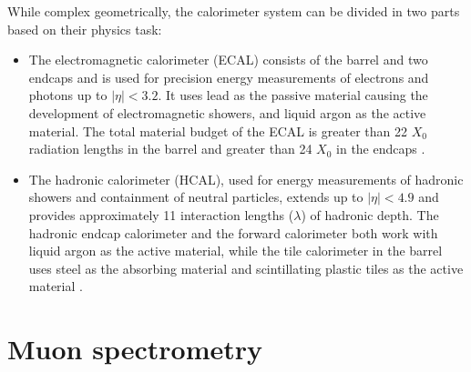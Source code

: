While complex geometrically, the calorimeter system can be divided
in two parts based on their physics task:
\begin{itemize}
\item The electromagnetic calorimeter (ECAL) consists of the barrel
and two endcaps and is used for precision energy measurements of electrons
and photons up to $|\eta| < 3.2$. It uses lead as
the passive material causing the development of electromagnetic
showers, and liquid argon as the active material. The total
material budget of the ECAL is greater than 22 $X_0$ radiation
lengths in the barrel and greater than 24 $X_0$ in the endcaps 
\cite{CERN-LHCC-96-041, Aad:2008zzm}.
\item The hadronic calorimeter (HCAL), used for energy measurements
of hadronic showers and containment of neutral particles, extends
up to $|\eta| < 4.9$ and provides approximately 11 interaction
lengths ($\lambda$) of hadronic depth. The hadronic endcap
calorimeter and the forward calorimeter both work with liquid
argon as the active material, while the tile calorimeter in the
barrel uses steel as the absorbing material and scintillating
plastic tiles as the active material \cite{CERN-LHCC-96-041,
artamonov2008atlas, Aad:2008zzm}.
\end{itemize}

\section{Muon spectrometry}

